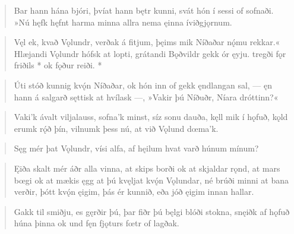 
\begin{verse}
\bva Bar hann hána bjóri,
þvíat hann bętr kunni,
svát hón í sessi
of sofnaði.
»Nú hęfk hęfnt
harma minna
allra nema ęinna
íviðgjǫrnum.\\%
\end{verse}


\begin{verse}
\bva Vęl ek, kvað Vǫlundr,
verðak á fitjum,
þęims mik Níðaðar
nǫ́mu rekkar.« 
Hlæjandi Vǫlundr
hófsk at lopti,
grátandi Bǫðvildr
gekk ór ęyju.
tregði fǫr friðils *
ok fǫður reiði. *\\%
\end{verse}


\begin{verse}
\bva Úti stóð kunnig
kvǫ́n Níðaðar,
ok hón inn of gekk
ęndlangan sal,
— ęn hann á salgarð
sęttisk at hvílask —,
»Vakir þú Níðuðr,
Níara dróttinn?« \\%
\end{verse}


\begin{verse}
\bva Vaki'k ávalt
viljalauss,
sofna'k minst,
síz sonu dauða,
kęll mik í hǫfuð,
kǫld erumk rǫ́ð þín,
vilnumk þess nú,
at við Vǫlund dœma'k.\\%
\end{verse}


\begin{verse}
\bva Sęg mér þat Vǫlundr,
vísi alfa,
af hęilum hvat varð
húnum mínum?\\%
\end{verse}


\begin{verse}
\bva Ęiða skalt mér áðr
alla vinna,
at skips borði
ok at skjaldar rǫnd,
at mars bœgi
ok at mækis ęgg
at þú kvęljat
kvǫ́n Vǫlundar,
né brúði minni
at bana verðir,
þótt kvǫ́n ęigim,
þás ér kunnið,
eða jóð ęigim
innan hallar.\\%
\end{verse}


\begin{verse}
\bva Gakk til smiðju,
es gęrðir þú,
þar fiðr þú bęlgi
blóði stokna,
snęiðk af hǫfuð
húna þinna
ok und fęn fjǫturs
fœtr of lagðak.\\%
\end{verse}


